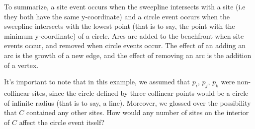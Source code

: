 \documentclass[12pt,twoside]{reedthesis}
\begin{document}
  To summarize, a site event occurs when the sweepline intersects with a site (i.e they both have the same y-coordinate) and a circle event occurs when the sweepline intersects with the lowest point (that is to say, the point with the minimum y-coordinate) of a circle. Arcs are added to the beachfront when site events occur, and removed when circle events occur. The effect of an adding an arc is the growth of a new edge, and the effect of removing an arc is the addition of a vertex.\par
  It's important to note that in this example, we assumed that $p_{i}$, $p_{j}$, $p_{k}$ were non-collinear sites, since the circle defined by three collinear points would be a circle of infinite radius (that is to say, a line). Moreover, we glossed over the possibility that $C$ contained any other sites. How would any number of sites on the interior of $C$ affect the circle event itself? \par 
\end{document}
